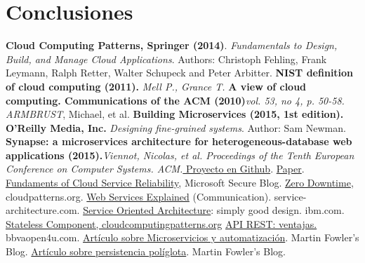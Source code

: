 \section{Conclusiones}\label{sec:conclu}


\begin{thebibliography}{1}
\textbf{Cloud Computing Patterns, Springer (2014)}. \textit{Fundamentals to Design, Build, and Manage Cloud Applications}. Authors: Christoph Fehling, Frank Leymann, Ralph Retter, Walter Schupeck and Peter Arbitter.
\textbf{NIST definition of cloud computing (2011).} \textit{Mell P., Grance T.}
\textbf{A view of cloud computing. Communications of the ACM (2010)}\textit{vol. 53, no 4, p. 50-58. ARMBRUST}, Michael, et al.
\textbf{Building Microservices (2015, 1st edition). O'Reilly Media, Inc.} \textit{Designing fine-grained systems}. Author: Sam Newman.
\textbf{Synapse: a microservices architecture for heterogeneous-database web applications (2015).}\textit{Viennot, Nicolas, et al. Proceedings of the Tenth European Conference on Computer Systems. ACM.}\href{https://github.com/nviennot/synapse}{ Proyecto en Github}. \href{http://viennot.com/synapse.pdf}{Paper}.
\href{https://blogs.microsoft.com/microsoftsecure/2012/09/12/fundamentals-of-cloud-service-reliability/}{Fundaments of Cloud Service Reliability}, Microsoft Secure Blog.
\href{http://cloudpatterns.org/design_patterns/zero_downtime}{Zero Downtime}, cloudpatterns.org.
\href{http://www.service-architecture.com/articles/web-services/web_services_explained.html}{Web Services Explained} (Communication). service-architecture.com.
\href{https://www-01.ibm.com/software/solutions/soa/}{Service Oriented Architecture}: simply good design. ibm.com.
\href{http://www.cloudcomputingpatterns.org/stateless_component/}{Stateless Component, cloudcomputingpatterns.org}
\href{https://bbvaopen4u.com/es/actualidad/api-rest-que-es-y-cuales-son-sus-ventajas-en-el-desarrollo-de-proyectos}{API REST: ventajas.}  bbvaopen4u.com.
\href{https://martinfowler.com/articles/microservices.html}{Artículo sobre Microservicios y automatización}. Martin Fowler's Blog.
\href{https://martinfowler.com/bliki/PolyglotPersistence.html#footnote-first-use}{Artículo sobre persistencia políglota}. Martin Fowler's Blog.
\end{thebibliography}

